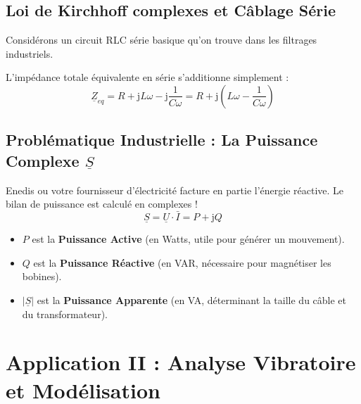 \documentclass[11pt,a4paper]{article}
\newcommand{\jc}{\mathrm{j}} %
\newcommand{\cpx}[1]{\underline{#1}} %
\begin{document}
\subsection{Loi de Kirchhoff complexes et Câblage Série}
Considérons un circuit RLC série basique qu'on trouve dans les filtrages industriels.
\begin{center}
\end{center}
L'impédance totale équivalente en série s'additionne simplement :
\[ \cpx{Z}_{eq} = R + \jc L\omega - \jc \frac{1}{C\omega} = R + \jc\left(L\omega - \frac{1}{C\omega}\right) \]

\subsection{Problématique Industrielle : La Puissance Complexe $\cpx{S}$}
Enedis ou votre fournisseur d'électricité facture en partie l'énergie réactive. Le bilan de puissance est calculé en complexes !
\[ \cpx{S} = \cpx{U} \cdot \bar{I} = P + \jc Q \]
\begin{itemize}
    \item $P$ est la \textbf{Puissance Active} (en Watts, utile pour générer un mouvement).
    \item $Q$ est la \textbf{Puissance Réactive} (en VAR, nécessaire pour magnétiser les bobines).
    \item $|\cpx{S}|$ est la \textbf{Puissance Apparente} (en VA, déterminant la taille du câble et du transformateur).
\end{itemize}

\section{Application II : Analyse Vibratoire et Modélisation}
\end{document}

